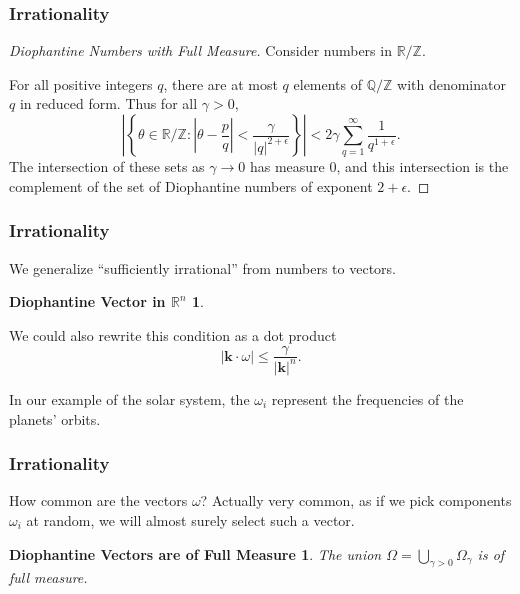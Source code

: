 \documentclass{beamer}
\newcommand{\Z}{\mathbb{Z}}
\newcommand{\Q}{\mathbb{Q}}
\newcommand{\R}{\mathbb{R}}
\newcommand{\bp}[1]{\bm{#1}}
\begin{document}
\begin{frame}
  \frametitle{Irrationality}
  \begin{proof}[Diophantine Numbers with Full Measure]
    Consider numbers in $\R / \Z$.

    For all positive integers $q$, there are at most $q$ elements of $\Q / \Z$
    with denominator $q$ in reduced form.
    Thus for all $\gamma > 0$,
    \begin{equation*}
      \left|\left\{ \theta \in \R / \Z : \left| \theta - \frac{p}{q} \right| <
          \frac{\gamma}{|q|^{2 + \epsilon}} \right\} \right| < 2 \gamma \sum_{q =
      1}^{\infty} \frac{1}{q^{1 + \epsilon}}.
  \end{equation*}
  The intersection of these sets as $\gamma \to 0$ has measure $0$, and this
  intersection is the complement of the set of Diophantine numbers of exponent
  $2 + \epsilon$.
  \end{proof}
\end{frame}

\begin{frame}
  \frametitle{Irrationality}
  We generalize ``sufficiently irrational'' from numbers to vectors.
  \newtheorem{diovec}{Diophantine Vector in $\mathbb{R}^n$}
  \begin{diovec}
    \diovector{}
  \end{diovec}

  We could also rewrite this condition as a dot product
  \begin{equation*}
    |\bp{k} \cdot \omega| \leq \frac{\gamma}{|\bp{k}|^n}.
  \end{equation*}

  In our example of the solar system, the $\omega_i$ represent the
  frequencies of the planets' orbits.
\end{frame}

\begin{frame}
  \frametitle{Irrationality}
  How common are the vectors $\omega$?
  Actually very common, as if we pick components $\omega_i$ at random, we will
  almost surely select such a vector.
  
  \newtheorem{diomeas}{Diophantine Vectors are of Full Measure}
  \begin{diomeas}
    The union $\Omega = \bigcup_{\gamma > 0} \Omega_{\gamma}$ is of full measure.
  \end{diomeas}
\end{frame}
\end{document}
